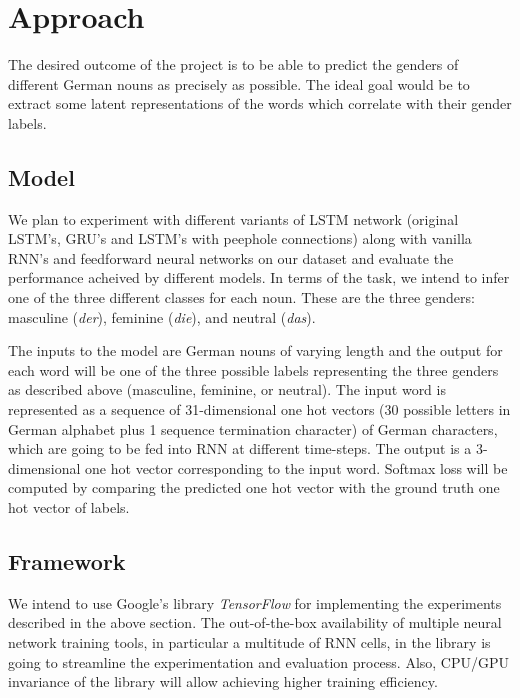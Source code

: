 \documentclass[10pt,twocolumn,letterpaper]{article}
\begin{document}
\section{Approach}
The desired outcome of the project is to be able to predict the genders of different German nouns as precisely as possible. The ideal goal would be to extract some latent representations of the words which correlate with their gender labels.\\

\subsection{Model}
We plan to experiment with different variants of LSTM network (original LSTM's, GRU's and LSTM's with peephole connections) along with vanilla RNN's and feedforward neural networks on our dataset and evaluate the performance acheived by different models. In terms of the task, we intend to infer one of the three different classes for each noun. These are the three genders: masculine (\textit{der}), feminine (\textit{die}), and neutral (\textit{das}).\par
The inputs to the model are German nouns of varying length and the output for each word will be one of the three possible labels representing the three genders as described above (masculine, feminine, or neutral). The input word is represented as a sequence of 31-dimensional one hot vectors (30 possible letters in German alphabet plus 1 sequence termination character) of German characters, which are going to be fed into RNN at different time-steps. The output is a 3-dimensional one hot vector corresponding to the input word. Softmax loss will be computed by comparing the predicted one hot vector with the ground truth one hot vector of labels.

\subsection{Framework}
We intend to use Google's library \textit{TensorFlow} for implementing the experiments described in the above section. The out-of-the-box availability of multiple neural network training tools, in particular a multitude of RNN cells, in the library is going to streamline the experimentation and evaluation process. Also, CPU/GPU invariance of the library will allow achieving higher training efficiency.
\end{document}
